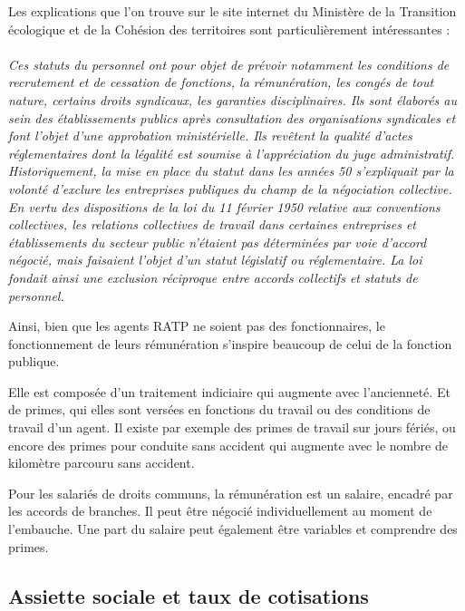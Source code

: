 Les explications que l'on trouve sur le site internet du Ministère de la Transition écologique et de la Cohésion des territoires sont particulièrement intéressantes :
\\
\textit{\\Ces statuts du personnel ont pour objet de prévoir notamment les conditions de recrutement et de cessation de fonctions, la rémunération, les congés de tout nature, certains droits syndicaux, les garanties disciplinaires. Ils sont élaborés au sein des établissements publics après consultation des organisations syndicales et font l’objet d’une approbation ministérielle. Ils revêtent la qualité d’actes réglementaires dont la légalité est soumise à l’appréciation du juge administratif.\\
Historiquement, la mise en place du statut dans les années 50 s’expliquait par la volonté d’exclure les entreprises publiques du champ de la négociation collective.
En vertu des dispositions de la loi du 11 février 1950 relative aux conventions collectives, les relations collectives de travail dans certaines entreprises et établissements du secteur public n’étaient pas déterminées par voie d’accord négocié, mais faisaient l’objet d’un statut législatif ou réglementaire. La loi fondait ainsi une exclusion réciproque entre accords collectifs et statuts de personnel.}

Ainsi, bien que les agents RATP ne soient pas des fonctionnaires, le fonctionnement de leurs rémunération s'inspire beaucoup de celui de la fonction publique.

Elle est composée d'un traitement indiciaire qui augmente avec l'ancienneté. Et de primes, qui elles sont versées en fonctions du travail ou des conditions de travail d'un agent. Il existe par exemple des primes de travail sur jours fériés, ou encore des primes pour conduite sans accident qui augmente avec le nombre de kilomètre parcouru sans accident.

Pour les salariés de droits communs, la rémunération est un salaire, encadré par les accords de branches. Il peut être négocié individuellement au moment de l'embauche. Une part du salaire peut également être variables et comprendre des primes.


\subsection{Assiette sociale et taux de cotisations}

